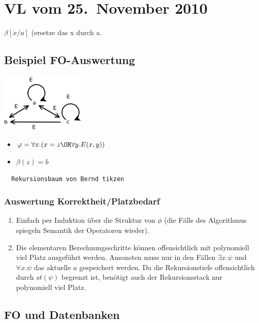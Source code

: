 \section{VL vom 25.~November 2010}
$\beta[x/a]$ (ersetze das x durch a.

\subsection{Beispiel FO-Auswertung}

\includegraphics[width=4cm]{25_11_10_1.png}

\begin{itemize}
  \item $\varphi = \forall x.(x=z \OR \forall y.E(x,y))$
  \item $\beta(z) = b$
\end{itemize}

\begin{verbatim}
  Rekursionsbaum von Bernd tikzen
\end{verbatim}

\subsubsection{Auswertung Korrektheit/Platzbedarf}

\begin{enumerate}
  \item Einfach per Induktion über die Struktur von $\phi$ (die Fälle
  des Algorithmus spiegeln Semantik der Operatoren wieder).
  
  \item Die elementaren Berechnungsschritte können offensichtlich mit
  polynomiell viel Platz ausgeführt werden. Ansonsten muss nur in den
  Fällen $\exists x.\psi$ und $\forall x.\psi$ das aktuelle $a$
  gespeichert werden. Da die Rekursionstiefe offensichtlich durch
  $st(\psi)$ begrenzt ist, benötigt auch der Rekursionsstack nur
  polynomiell viel Platz.
\end{enumerate}

\subsection{FO und Datenbanken}

